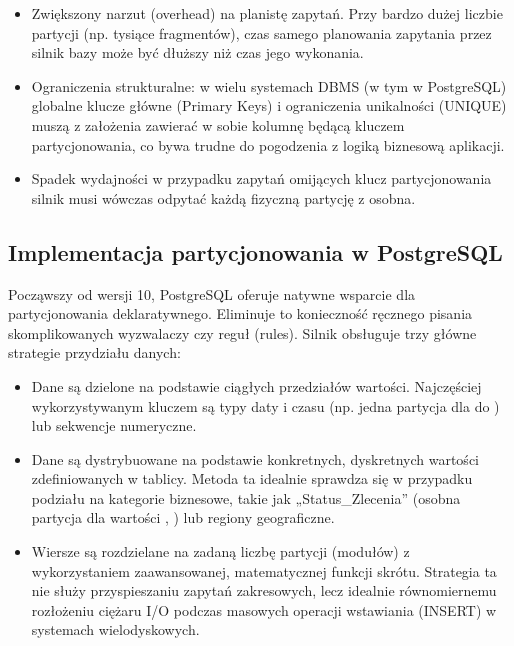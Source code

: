 \documentclass[letterpaper,10pt,polish]{sphinxmanual}
\begin{document}
\sphinxAtStartPar
{}
\begin{itemize}
\item {} 
\sphinxAtStartPar
Zwiększony narzut (overhead) na planistę zapytań. Przy bardzo dużej liczbie partycji (np. tysiące fragmentów), czas samego planowania zapytania przez silnik bazy może być dłuższy niż czas jego wykonania.

\item {} 
\sphinxAtStartPar
Ograniczenia strukturalne: w wielu systemach DBMS (w tym w PostgreSQL) globalne klucze główne (Primary Keys) i ograniczenia unikalności (UNIQUE) muszą z założenia zawierać w sobie kolumnę będącą kluczem partycjonowania, co bywa trudne do pogodzenia z logiką biznesową aplikacji.

\item {} 
\sphinxAtStartPar
Spadek wydajności w przypadku zapytań omijących klucz partycjonowania \textendash{} silnik musi wówczas odpytać każdą fizyczną partycję z osobna.

\end{itemize}


\subsection{Implementacja partycjonowania w PostgreSQL}
\label{\detokenize{rozdzia_u0142_2/rozdzia_u0142_26/index:implementacja-partycjonowania-w-postgresql}}
\sphinxAtStartPar
Począwszy od wersji 10, PostgreSQL oferuje natywne wsparcie dla partycjonowania deklaratywnego. Eliminuje to konieczność ręcznego pisania skomplikowanych wyzwalaczy czy reguł (rules). Silnik obsługuje trzy główne strategie przydziału danych:
\begin{itemize}
\item {} 
\sphinxAtStartPar
{} Dane są dzielone na podstawie ciągłych przedziałów wartości. Najczęściej wykorzystywanym kluczem są typy daty i czasu (np. jedna partycja dla  do ) lub sekwencje numeryczne.

\item {} 
\sphinxAtStartPar
{} Dane są dystrybuowane na podstawie konkretnych, dyskretnych wartości zdefiniowanych w tablicy. Metoda ta idealnie sprawdza się w przypadku podziału na kategorie biznesowe, takie jak „Status\_Zlecenia” (osobna partycja dla wartości , ) lub regiony geograficzne.

\item {} 
\sphinxAtStartPar
{} Wiersze są rozdzielane na zadaną liczbę partycji (modułów) z wykorzystaniem zaawansowanej, matematycznej funkcji skrótu. Strategia ta nie służy przyspieszaniu zapytań zakresowych, lecz idealnie równomiernemu rozłożeniu ciężaru I/O podczas masowych operacji wstawiania (INSERT) w systemach wielodyskowych.

\end{itemize}
\end{document}
